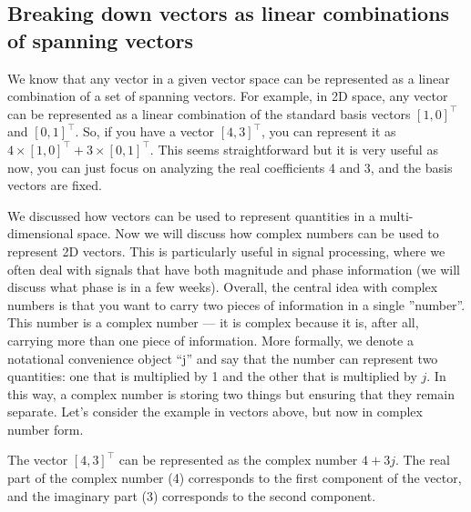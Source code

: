 \subsection{Breaking down vectors as linear combinations of spanning vectors}
We know that any vector in a given vector space can be represented as a linear combination of a set of spanning vectors. For example, in 2D space, any vector can be represented as a linear combination of the standard basis vectors $[1,0]^\top$ and $[0,1]^\top$. So, if you have a vector $[4, 3]^\top$, you can represent it as $4 \times [1,0]^\top + 3 \times [0,1]^\top$. This seems straightforward but it is very useful as now, you can just focus on analyzing the real coefficients 4 and 3, and the basis vectors are fixed.  

We discussed how vectors can be used to represent quantities in a multi-dimensional space. Now we will discuss how complex numbers can be used to represent 2D vectors. This is particularly useful in signal processing, where we often deal with signals that have both magnitude and phase information (we will discuss what phase is in a few weeks). Overall, the central idea with complex numbers is that you want to carry two pieces of information in a single ''number''. This number is a complex number --- it is complex because it is, after all, carrying more than one piece of information. More formally, we denote a notational convenience object ``j'' and say that the number can represent two quantities: one that is multiplied by 1 and the other that is multiplied by $j$. In this way, a complex number is storing two things but ensuring that they remain separate. Let's consider the example in vectors above, but now in complex number form. 

The vector $[4, 3]^\top$ can be represented as the complex number $4 + 3j$. The real part of the complex number (4) corresponds to the first component of the vector, and the imaginary part (3) corresponds to the second component.
